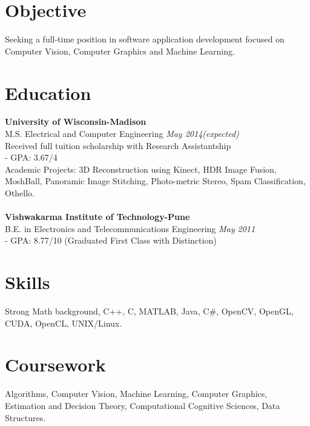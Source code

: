 \documentclass[margin]{res}
\begin{document}
 

 

\address{thite@wisc.edu\\(408) 601-9349 }
\address{2110 University Avenue, Apt. 104, \\ Madison, WI-53726.}

 
\begin{resume} 
 
\section{Objective} 
Seeking a full-time position in software application development focused on Computer Vision, Computer Graphics and Machine Learning.

\section{Education} 
{\bf University of Wisconsin-Madison} \\
M.S. Electrical and Computer Engineering \hfill {\it May 2014(expected)} \\
Received full tuition scholarship with Research Assistantship \\
- GPA: 3.67/4 \\
Academic Projects: 3D Reconstruction using Kinect, HDR Image Fusion, MoshBall, Panoramic Image Stitching, Photo-metric Stereo, Spam Classification, Othello.
\\ \\
{\bf Vishwakarma Institute of Technology-Pune} \\
B.E. in Electronics and Telecommunications Engineering \hfill {\it May 2011} \\
- GPA: 8.77/10 (Graduated First Class with Distinction)
\section{Skills}
Strong Math background, C++, C, MATLAB, Java, C\#, OpenCV, OpenGL, CUDA, OpenCL, UNIX/Linux.

\section{Coursework}
Algorithms, Computer Vision, Machine Learning, Computer Graphics, Estimation and Decision Theory, Computational Cognitive Sciences, Data Structures.


\end{resume}
\end{document}
